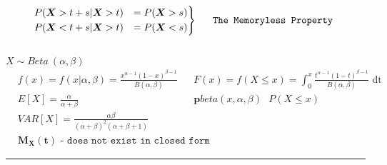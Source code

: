 \documentclass{article}
\begin{document}
\begin{equation*}
\begin{rcases}
    P(\boldsymbol{X} > t + s| \boldsymbol{X} > t) &= P(\boldsymbol{X} > s) \\
    P(\boldsymbol{X} < t + s| \boldsymbol{X} > t) &= P(\boldsymbol{X} < s)
\end{rcases}
    \texttt{\ \ \ The Memoryless Property }
\end{equation*} \\
$ X \sim Beta\ (\alpha,\beta) $ \\
\indent{}
\begin{align*}
    & f(x) = f(x|\alpha,\beta) = \frac{x^{\alpha-1}(1-x)^{\beta-1}}{B(\alpha,\beta)} && F(x) = f(X \leq x) = \int_{0}^{x} \frac{t^{\alpha -1}(1-t)^{\beta -1}}{B(\alpha,\beta)} \text{ dt} \\
    & E[X] = \frac{\alpha}{\alpha + \beta} && \boldsymbol{p}beta(x, \alpha, \beta)\ \ \ P(X \leq x) \\
    & VAR[X] = \frac{\alpha\beta}{(\alpha + \beta)^{2}(\alpha + \beta + 1)} &&  \\
    & \boldsymbol{M_X(t)} \texttt{ - does not exist in closed form}
\end{align*}

\hrule
\end{document}
